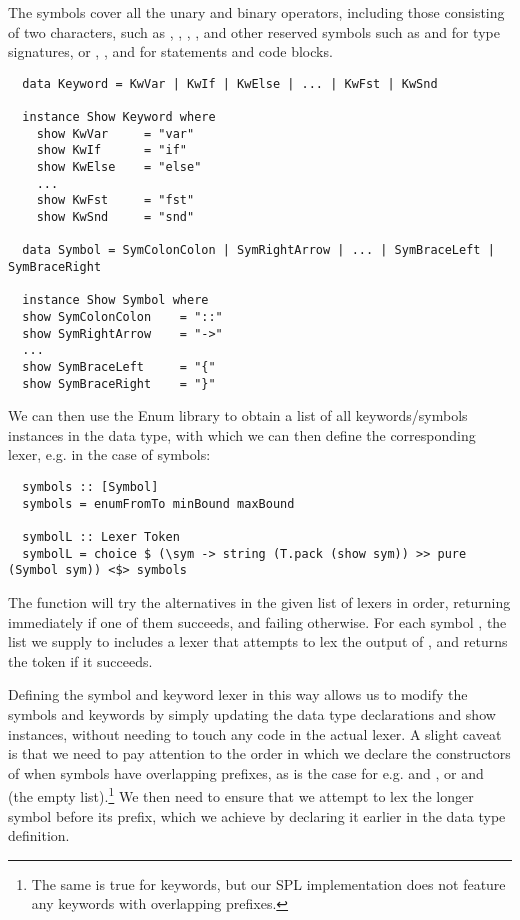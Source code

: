 The symbols cover all the unary and binary operators, including those consisting
of two characters, such as \spl{\|\|}, \spl{&&}, \spl{=}\spl{=}, \spl{!=}, and
other reserved symbols such as \spl{::} and \spl{->} for type signatures, or
\spl{=}, \spl{;}, \spl{\{} and \spl{\}} for statements and code blocks.
%
\begin{verbatim}
  data Keyword = KwVar | KwIf | KwElse | ... | KwFst | KwSnd

  instance Show Keyword where
    show KwVar     = "var"
    show KwIf      = "if"
    show KwElse    = "else"
    ...
    show KwFst     = "fst"
    show KwSnd     = "snd"

  data Symbol = SymColonColon | SymRightArrow | ... | SymBraceLeft | SymBraceRight

  instance Show Symbol where
  show SymColonColon    = "::"
  show SymRightArrow    = "->"
  ...
  show SymBraceLeft     = "{"
  show SymBraceRight    = "}"
\end{verbatim}

We can then use the Enum library to obtain a list of all keywords/symbols
instances in the data type, with which we can then define the corresponding
lexer, e.g. in the case of symbols:
%
\begin{verbatim}
  symbols :: [Symbol]
  symbols = enumFromTo minBound maxBound

  symbolL :: Lexer Token
  symbolL = choice $ (\sym -> string (T.pack (show sym)) >> pure (Symbol sym)) <$> symbols
\end{verbatim}
%
The  function will try the alternatives in the given list of lexers
in order, returning immediately if one of them succeeds, and failing otherwise.
For each symbol , the list we supply to  includes a lexer
that attempts to lex the output of , and returns the token
 if it succeeds.

Defining the symbol and keyword lexer in this way allows us to modify the
symbols and keywords by simply updating the data type declarations and show
instances, without needing to touch any code in the actual lexer.
A slight caveat is that we need to pay attention to the order in which we
declare the constructors of  when
symbols have overlapping prefixes, as is the case for e.g.
\spl{:} and \spl{::}, or \spl{[} and \spl{[]} (the empty list).\footnote{The
same is true for keywords, but our SPL implementation does not feature any
keywords with overlapping prefixes.}
We then need to ensure that we attempt to lex the longer symbol before its
prefix, which we achieve by declaring it earlier in the data type definition.


